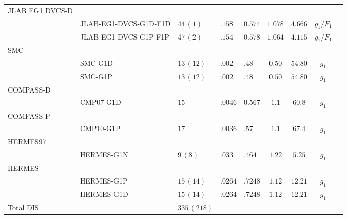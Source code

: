 \begin{tabularx}{1\pdfpagewidth}{llXXXcccc}
  \midrule
   JLAB EG1 DVCS-D 
       \\        & JLAB-EG1-DVCS-G1D-F1D & $44\,(1)$ & $.158$ & $0.574$ & $1.078$ & $4.666$ & $g_1/F_1$ & \cite{CLAS:2014qtg}
       \\        & JLAB-EG1-DVCS-G1P-F1P & $47\,(2)$ & $.154$ & $0.578$ & $1.064$ & $4.115$ & $g_1/F_1$ & \cite{CLAS:2014qtg} \\
  \midrule
   SMC
       \\        & SMC-G1D & $13\,(12)$ & $.002$ & $.48$ & $0.50$ & $54.80$ & $g_1$ &  \cite{SpinMuon:1999udj} 
       \\        & SMC-G1P & $13\,(12)$ & $.002$ & $.48$ & $0.50$ & $54.80$ & $g_1$ &  \cite{SpinMuon:1999udj} \\
  \midrule 
   COMPASS-D
       \\        & CMP07-G1D & $15$ & $.0046$ & $0.567$ & $1.1$ & $60.8$ & $g_1$ & \cite{COMPASS:2006mhr} \\
  \midrule
   COMPASS-P 
       \\        & CMP10-G1P & $17$ & $.0036$ & $.57$ & $1.1$ & $67.4$ & $g_1$ & \cite{COMPASS:2010wkz} \\
  \midrule 
   HERMES97 
       \\        & HERMES-G1N & $9\,(8)$ & $.033$ & $.464$ & $1.22$ & $5.25$ & $g_1$ & \cite{HERMES:1997hjr} \\
  \midrule
   HERMES 
       \\        & HERMES-G1P & $15\,(14)$ & $.0264$ & $.7248$ & $1.12$ & $12.21$ & $g_1$ & \cite{HERMES:2006jyl} 
       \\        & HERMES-G1D & $15\,(14)$ & $.0264$ & $.7248$ & $1.12$ & $12.21$ & $g_1$ & \cite{HERMES:2006jyl} \\
  \midrule
   Total DIS         &    & $335 \, (218)$  & & &  &    &      &      \\
  \bottomrule
\end{tabularx}